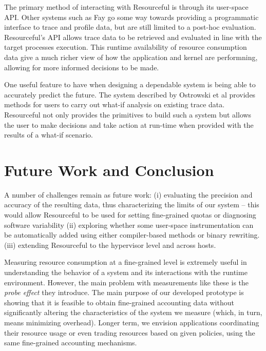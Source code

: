 \documentclass[letterpaper,twocolumn,10pt]{article}
\newcommand{\pname}{Resourceful}
\begin{document}
The primary method of interacting with \pname{} is through its user-space API.
Other systems such as Fay \cite{fay} go some way towards providing a programmatic
interface to trace and profile data, but are still limited to a post-hoc
evaluation. \pname{}'s API allows trace data to be retrieved and evaluated in
line with the target processes execution. This runtime availability of resource
consumption data give a much richer view of how the application and kernel are
performning, allowing for more informed decisions to be made. 

One useful feature to have when designing a dependable system is being able to
accurately predict the future. The system described by Ostrowski et al
\cite{ostrowski} provides methods for users to carry out what-if analysis on
existing trace data. \pname{} not only provides the primitives to build such a
system but allows the user to make decisions and take action at run-time when
provided with the results of a what-if scenario.




\section{Future Work and Conclusion} 
A number of challenges remain as future work: (i) evaluating the precision and
accuracy of the resulting data, thus characterizing the limits of our system -- this
would allow \pname{ }to be used for setting fine-grained quotas or diagnosing
software variability (ii) exploring whether some user-space instrumentation can
be automatically added using either compiler-based methods or binary rewriting.
(iii) extending \pname{ } to the hypervisor level and across hosts.

Measuring resource consumption at a fine-grained level is extremely useful in
understanding the behavior of a system and its interactions with the runtime
environment. However, the main problem with measurements like these is the
\emph{probe effect} they introduce. The main purpose of our developed prototype
is showing that it is feasible to obtain fine-grained accounting data without
significantly altering the characteristics of the system we measure (which, in
turn, means minimizing overhead). Longer term, we envision applications
coordinating their resource usage or even trading resources based on given
policies, using the same fine-grained accounting mechanisms.


{\footnotesize  }
\end{document}
